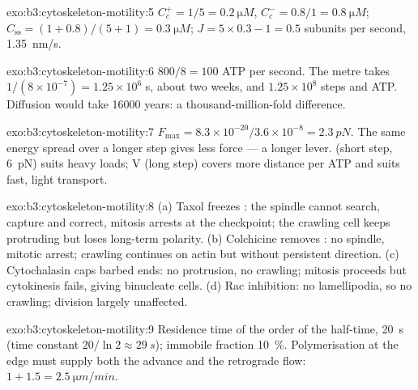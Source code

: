\begin{solution}{exo:b3:cytoskeleton-motility:5}
$C_{c}^{+} = 1/5 = \qty{0.2}{\micro M}$, $C_{c}^{-} = 0.8/1 =
\qty{0.8}{\micro M}$; $C_{\text{ss}} = (1 + 0.8)/(5 + 1) = \qty{0.3}{\micro
M}$; $J = 5\times 0.3 - 1 = 0.5$ subunits per second, \qty{1.35}{nm/s}.
\end{solution}

\begin{solution}{exo:b3:cytoskeleton-motility:6}
$800/8 = 100$ ATP per second. The metre takes $1/(8\times 10^{-7}) =
1.25\times 10^{6}$ s, about two weeks, and $1.25\times 10^{8}$ steps and
ATP. Diffusion would take \num{16000} years: a thousand-million-fold
difference.
\end{solution}

\begin{solution}{exo:b3:cytoskeleton-motility:7}
$F_{\max} = 8.3\times 10^{-20}/3.6\times 10^{-8} = \qty{2.3}{pN}$. The same
energy spread over a longer step gives less force --- a longer lever.
 (short step, \qty{6}{pN}) suits heavy loads;  V (long
step) covers more distance per ATP and suits fast, light transport.
\end{solution}

\begin{solution}{exo:b3:cytoskeleton-motility:8}
(a) Taxol freezes : the spindle cannot search, capture and
correct, mitosis arrests at the checkpoint; the crawling cell keeps
protruding but loses long-term polarity. (b) Colchicine removes
: no spindle, mitotic arrest; crawling continues on actin
but without persistent direction. (c) Cytochalasin caps barbed ends: no
protrusion, no crawling; mitosis proceeds but cytokinesis fails, giving
binucleate cells. (d) Rac inhibition: no lamellipodia, so no crawling;
division largely unaffected.
\end{solution}

\begin{solution}{exo:b3:cytoskeleton-motility:9}
Residence time of the order of the half-time, \qty{20}{s} (time constant
$20/\ln 2 \approx \qty{29}{s}$); immobile fraction \qty{10}{\%}.
Polymerisation at the edge must supply both the advance and the
retrograde flow: $1 + 1.5 = \qty{2.5}{\micro m/min}$.
\end{solution}

